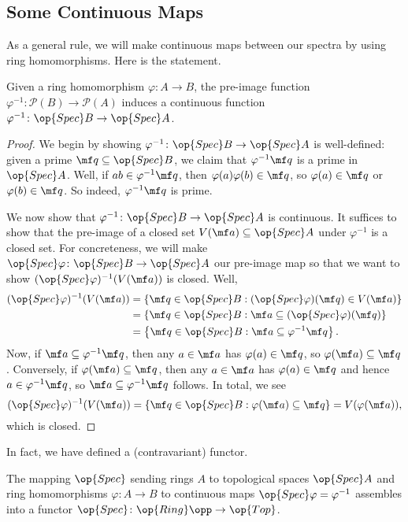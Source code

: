 \documentclass[../notes.tex]{subfiles}
\begin{document}
\subsection{Some Continuous Maps}
As a general rule, we will make continuous maps between our spectra by using ring homomorphisms. Here is the statement.
\begin{lemma} \label{lem:specmorphism}
	Given a ring homomorphism $\varphi\colon A\to B$, the pre-image function $\varphi^{-1}\colon\mathcal P(B)\to\mathcal P(A)$ induces a continuous function $\varphi^{-1}\colon\op{Spec}B\to\op{Spec}A$.
\end{lemma}
\begin{proof}
	We begin by showing $\varphi^{-1}\colon\op{Spec}B\to\op{Spec}A$ is well-defined: given a prime $\mf q\subseteq\op{Spec}B$, we claim that $\varphi^{-1}\mf q$ is a prime in $\op{Spec}A$. Well, if $ab\in\varphi^{-1}\mf q$, then $\varphi(a)\varphi(b)\in\mf q$, so $\varphi(a)\in\mf q$ or $\varphi(b)\in\mf q$. So indeed, $\varphi^{-1}\mf q$ is prime.

	We now show that $\varphi^{-1}\colon\op{Spec}B\to\op{Spec}A$ is continuous. It suffices to show that the pre-image of a closed set $V(\mf a)\subseteq\op{Spec}A$ under $\varphi^{-1}$ is a closed set. For concreteness, we will make $\op{Spec}\varphi\colon\op{Spec}B\to\op{Spec}A$ our pre-image map so that we want to show $(\op{Spec}\varphi)^{-1}(V(\mf a))$ is closed. Well,
	\begin{align*}
		(\op{Spec}\varphi)^{-1}(V(\mf a)) &= \{\mf q\in\op{Spec}B:(\op{Spec}\varphi)(\mf q)\in V(\mf a)\} \\
		&= \{\mf q\in\op{Spec}B:\mf a\subseteq(\op{Spec}\varphi)(\mf q)\} \\
		&= \left\{\mf q\in\op{Spec}B:\mf a\subseteq\varphi^{-1}\mf q\right\}.
	\end{align*}
	Now, if $\mf a\subseteq\varphi^{-1}\mf q$, then any $a\in\mf a$ has $\varphi(a)\in\mf q$, so $\varphi(\mf a)\subseteq\mf q$. Conversely, if $\varphi(\mf a)\subseteq\mf q$, then any $a\in\mf a$ has $\varphi(a)\in\mf q$ and hence $a\in\varphi^{-1}\mf q$, so $\mf a\subseteq\varphi^{-1}\mf q$ follows. In total, we see
	\[(\op{Spec}\varphi)^{-1}(V(\mf a))=\left\{\mf q\in\op{Spec}B:\varphi(\mf a)\subseteq\mf q\right\}=V(\varphi(\mf a)),\]
	which is closed.
\end{proof}
In fact, we have defined a (contravariant) functor.
\begin{proposition}
	The mapping $\op{Spec}$ sending rings $A$ to topological spaces $\op{Spec}A$ and ring homomorphisms $\varphi\colon A\to B$ to continuous maps $\op{Spec}\varphi=\varphi^{-1}$ assembles into a functor ${\op{Spec}}\colon\op{Ring}\opp\to\op{Top}$.
\end{proposition}
\end{document}
